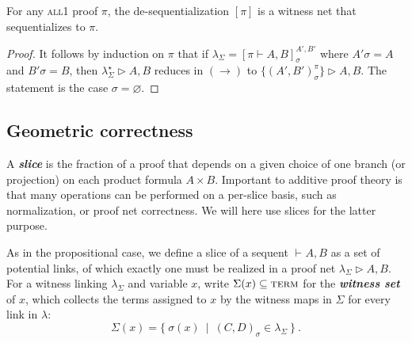 \documentclass[UKenglish]{lipics-v2016}
\theoremstyle{plain}
\newcommand\defn[1]{\textit{\textbf{#1}}}
\newcommand\terms{\textsc{term}}
\newcommand\all{\textsc{all}}
\newcommand\+{+}
\renewcommand\*{\times}
\newcommand\seq[3][]{{\vdash_{#1}}#2,#3}
\newcommand\prf[3]{#1\vdash\!#2,#3}
\newcommand\net[3]{#1\triangleright #2,#3}
\newcommand\deseq[4][\sigma]{[#2]_{#1}^{#3,#4}}
\newcommand\link[3][\sigma]{(#2,#3)_{#1}}
\newcommand\scoal{\rightarrow} %
\begin{document}
\begin{theorem}
For any \all1 proof $\pi$, the de-sequentialization $[\pi]$ is a witness net that sequentializes to $\pi$. 
\end{theorem}

\begin{proof}
It follows by induction on $\pi$ that if $\lambda_\Sigma=\deseq{\prf\pi AB}{A'}{B'}$ where $A'\sigma=A$ and $B'\sigma=B$, then $\net{\lambda^\star_\Sigma}AB$ reduces in $(\scoal)$ to $\net{\{\link{A'}{B'}^\pi\}}AB$. The statement is the case $\sigma=\varnothing$.
\end{proof}


\subsection{Geometric correctness}

A \defn{slice} is the fraction of a proof that depends on a given choice of one branch (or projection) on each product formula $A\*B$. Important to additive proof theory is that many operations can be performed on a per-slice basis, such as normalization, or proof net correctness. We will here use slices for the latter purpose.

As in the propositional case, we define a slice of a sequent $\seq AB$ as a set of potential links, of which exactly one must be realized in a proof net $\net{\lambda_\Sigma}AB$. For a witness linking $\lambda_\Sigma$ and variable $x$, write $\Sigma(x)\subseteq\terms$ for the \defn{witness set} of $x$, which collects the terms assigned to $x$ by the witness maps in $\Sigma$ for every link in $\lambda$:
\[
	\Sigma(x) = \{~\sigma(x)~\mid~\link CD\in\lambda_\Sigma~\}~.
\]
\end{document}
